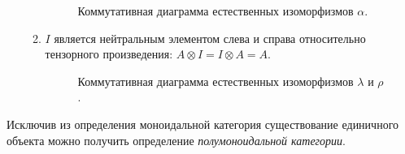 \begin{definition}
\begin{enumerate}
\begin{enumerate}
\begin{figure}[h]
    \caption{Коммутативная диаграмма естественных изоморфизмов $\alpha$.}
    \label{cd:alpha}
\end{figure}
        \item $I$ является нейтральным элементом слева и справа относительно тензорного произведения: $A \otimes I = I \otimes A = A$.
\begin{figure}[h]
  \centering
    \caption{Коммутативная диаграмма естественных изоморфизмов $\lambda$ и $\rho$.}
    \label{cd:lambdarho}
\end{figure}
      \end{enumerate} 
  \end{enumerate}
\end{definition}

Исключив из определения моноидальной категория существование единичного объекта можно получить определение \emph{полумоноидальной категории}.

